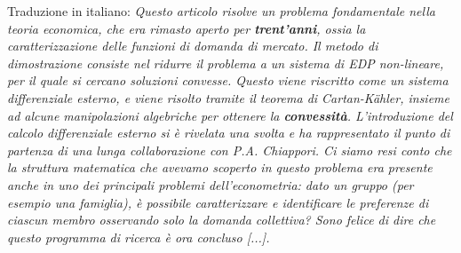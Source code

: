 \vspace{3mm}
Traduzione in italiano:
\textit{Questo articolo risolve un problema fondamentale nella teoria economica, che era rimasto aperto per \textbf{trent'anni}, ossia la caratterizzazione delle funzioni di domanda di mercato. Il metodo di dimostrazione consiste nel ridurre il problema a un sistema di EDP non-lineare, per il quale si cercano soluzioni convesse. Questo viene riscritto come un sistema differenziale esterno, e viene risolto tramite il teorema di Cartan-Kähler, insieme ad alcune manipolazioni algebriche per ottenere la \textbf{convessità}. L'introduzione del calcolo differenziale esterno si è rivelata una svolta e ha rappresentato il punto di partenza di una lunga collaborazione con P.A. Chiappori. Ci siamo resi conto che la struttura matematica che avevamo scoperto in questo problema era presente anche in uno dei principali problemi dell'econometria: dato un gruppo (per esempio una famiglia), è possibile caratterizzare e identificare le preferenze di ciascun membro osservando solo la domanda collettiva? Sono felice di dire che questo programma di ricerca è ora concluso [...].}

\newpage
\blankpage





